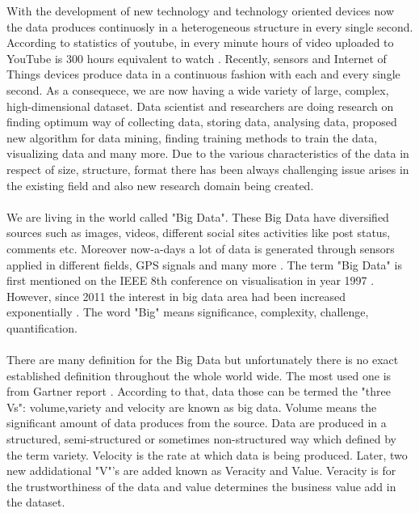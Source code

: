 With the development of new technology and technology oriented devices now the data produces continuosly in a heterogeneous structure in every single second. According to statistics of youtube, in every minute hours of video uploaded to YouTube is 300 hours equivalent to watch \cite{p301}. Recently, sensors and Internet of Things devices produce data in a continuous fashion with each and every single second. As a consequece, we are now having a wide variety of large, complex, high-dimensional dataset. Data scientist and researchers are doing research on finding optimum way of collecting data, storing data, analysing data, proposed new algorithm for data mining, finding training methods to train the data, visualizing data and many more. Due to the various characteristics of the data in respect of size, structure, format there has been always challenging issue arises in the existing field and also new research domain being created.\\\\
We are living in the world called "Big Data". These Big Data have diversified sources such as images, videos,  different social sites activities like post status, comments etc. Moreover now-a-days a lot of data is generated through sensors applied in different fields, GPS signals and many more \cite{p302}. The term "Big Data" is first mentioned on the IEEE 8th conference on visualisation in year 1997 \cite{p303}. However, since 2011 the interest in big data area had been increased exponentially \cite{p304}. The word "Big" means significance, complexity, challenge, quantification.\\\\
There are many definition for the Big Data but unfortunately there is no exact established definition throughout the whole world wide. The most used one is from Gartner report \cite{p305}. According to that, data those can be termed the "three Vs":  volume,variety and velocity are known as big data. Volume means the significant amount of data produces from the source. Data are produced in a structured, semi-structured or sometimes non-structured way which defined by the term variety. Velocity is the rate at which data is being produced. Later, two new addidational "V"'s are added known as Veracity and Value. Veracity is for the trustworthiness of the data and value determines the business value add in the dataset.\\\\

